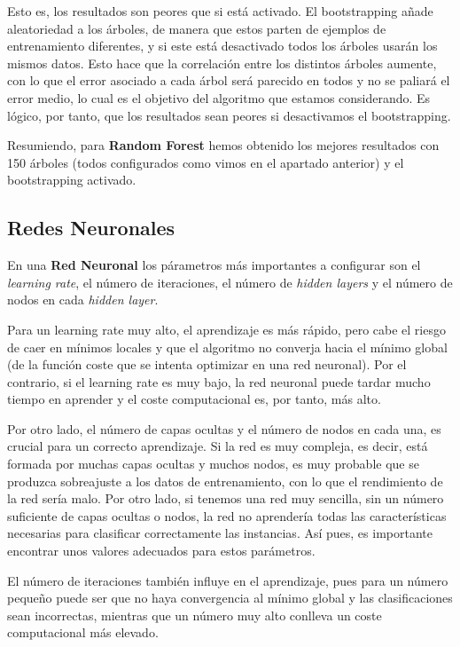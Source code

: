 \documentclass[a4paper,11pt]{article}
\begin{document}
Esto es, los resultados son peores que si está activado. El bootstrapping añade aleatoriedad a los árboles, de manera que estos parten de ejemplos de entrenamiento diferentes, y si este está desactivado todos los árboles usarán los mismos datos. Esto hace que la correlación entre los distintos árboles aumente, con lo que el error asociado a cada árbol será parecido en todos y no se paliará el error medio, lo cual es el objetivo del algoritmo que estamos considerando. Es lógico, por tanto, que los resultados sean peores si desactivamos el bootstrapping.

Resumiendo, para \textbf{Random Forest} hemos obtenido los mejores resultados con 150 árboles (todos configurados como vimos en el apartado anterior) y el bootstrapping activado. 

\subsection{Redes Neuronales}

En una \textbf{Red Neuronal} los párametros más importantes a configurar son el \textit{learning rate}, el número de iteraciones, el número de \textit{hidden layers} y el número de nodos en cada \textit{hidden layer}.

Para un learning rate muy alto, el aprendizaje es más rápido, pero cabe el riesgo de caer en mínimos locales y que el algoritmo no converja hacia el mínimo global (de la función coste que se intenta optimizar en una red neuronal). Por el contrario, si el learning rate es muy bajo, la red neuronal puede tardar mucho tiempo en aprender y el coste computacional es, por tanto, más alto. 

Por otro lado, el número de capas ocultas y el número de nodos en cada una, es crucial para un correcto aprendizaje. Si la red es muy compleja, es decir, está formada por muchas capas ocultas y muchos nodos, es muy probable que se produzca sobreajuste a los datos de entrenamiento, con lo que el rendimiento de la red sería malo. Por otro lado, si tenemos una red muy sencilla, sin un número suficiente de capas ocultas o nodos, la red no aprendería todas las características necesarias para clasificar correctamente las instancias. Así pues, es importante encontrar unos valores adecuados para estos parámetros.  

El número de iteraciones también influye en el aprendizaje, pues para un número pequeño puede ser que no haya convergencia al mínimo global y las clasificaciones sean incorrectas, mientras que un número muy alto conlleva un coste computacional más elevado. 
\end{document}
